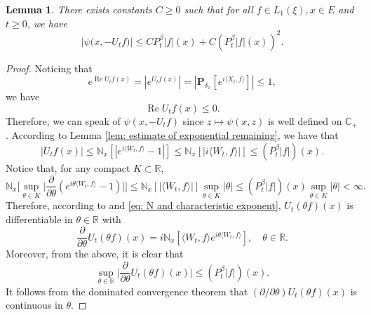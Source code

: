 \documentclass[UTF8]{pkuthss}
\theoremstyle{plain}
\newtheorem{lem}[thm]{Lemma}
\theoremstyle{definition}
\numberwithin{equation}{section}
\begin{document}
\begin{lem}
    There exists constants $C\geq 0$ such that for all $f \in L_1(\xi),x\in E$ and $t\geq 0$, we have
\begin{equation}
\label{eq: upper bound of psi(v)}
    \big|\psi\big(x,-U_tf\big)\big|
    \leq C P^{\beta}_t |f|(x)+
         C (P^{\beta}_t |f| (x))^2.
\end{equation}
\end{lem}
\begin{proof}
     Noticing that
\[
    e^{\operatorname{Re} U_tf(x)}
    = |e^{U_tf(x)}|
    = |\mathbf P_{\delta_x}[e^{i \langle X_t, f\rangle}]|
    \leq 1,
\]
    we have
\begin{equation}
\label{eq: -v has positive real part}
 \operatorname{Re} U_tf(x)
    \leq 0.
\end{equation}
    Therefore, we can speak of $\psi(x,-U_tf)$ since $z\mapsto \psi(x,z)$ is well defined on $\mathbb C_+$.
    According to Lemma \ref{lem: estimate of exponential remaining}, we have that
\begin{equation}
\label{eq: upper bound for vf}
    |U_tf(x)| \leq \mathbb N_x[|e^{i \langle W_t, f\rangle} - 1|]
    \leq \mathbb N_x[|i \langle W_t, f\rangle|]
    \leq (P^{\beta}_t |f|)(x).
\end{equation}
    Notice that, for any compact $K \subset \mathbb R$,
\begin{equation}
\label{eq: estimate of deriavetive of v(theta)}
    \mathbb N_x\Big[\sup_{\theta \in K} \Big|\frac{\partial}{\partial \theta} (e^{i\theta \langle W_t, f\rangle} - 1) \Big|\Big]
    \leq \mathbb N_x[|\langle W_t, f\rangle|] \sup_{\theta \in K}|\theta|
    \leq (P^{\beta}_t |f|)(x) \sup_{\theta \in K}|\theta| < \infty.
\end{equation}
    Therefore, according to \cite[Theorem A.5.2]{Durrett2010Probability} and \eqref{eq: N and characteristic exponent},
    $U_t(\theta f)(x)$ is differentiable in $\theta \in \mathbb R$ with
\[
    \frac{\partial}{\partial \theta} U_t(\theta f)(x)
    = i\mathbb N_x[\langle W_t, f\rangle e^{i\theta \langle W_t, f\rangle}],
    \quad \theta \in \mathbb R.
\]
    Moreover, from the above, it is clear that
\begin{equation}
\label{eq: upper bounded for derivative of v(theta)}
    \sup_{\theta \in \mathbb R}\Big| \frac{\partial}{\partial \theta}U_t(\theta f)(x)\Big|
    \leq ( P^{\beta}_t |f|)(x).
\end{equation}
    It follows from the dominated convergence theorem that $(\partial/\partial \theta)U_t(\theta f)(x)$ is continuous in $\theta$.

\end{proof}
\end{document}
